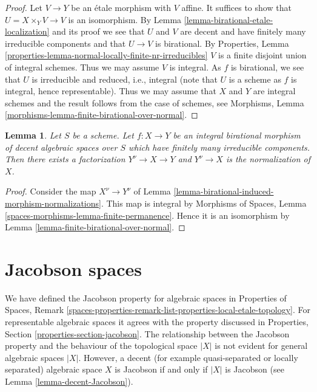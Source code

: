 \documentclass{stacks-project}
\theoremstyle{plain}
\newtheorem{lemma}[subsection]{Lemma}
\theoremstyle{definition}
\theoremstyle{remark}
\numberwithin{equation}{subsection}
\begin{document}
\begin{proof}
Let $V \to Y$ be an \'etale morphism with $V$ affine. It suffices to show that
$U = X \times_Y V \to V$ is an isomorphism. By
Lemma \ref{lemma-birational-etale-localization} and its proof
we see that $U$ and $V$ are decent and have finitely many
irreducible components and that $U \to V$ is birational.
By Properties, Lemma
\ref{properties-lemma-normal-locally-finite-nr-irreducibles}
$V$ is a finite disjoint union of integral schemes.
Thus we may assume $V$ is integral. As $f$ is birational, we
see that $U$ is irreducible and reduced, i.e., integral
(note that $U$ is a scheme as $f$ is integral, hence representable).
Thus we may assume that $X$ and $Y$ are integral schemes
and the result follows from the case of schemes, see
Morphisms, Lemma \ref{morphisms-lemma-finite-birational-over-normal}.
\end{proof}

\begin{lemma}
\label{lemma-normalization-normal}
Let $S$ be a scheme. Let $f : X \to Y$ be an integral birational morphism of
decent algebraic spaces over $S$ which have finitely many irreducible
components. Then there exists a factorization $Y^\nu \to X \to Y$ and
$Y^\nu \to X$ is the normalization of $X$.
\end{lemma}

\begin{proof}
Consider the map $X^\nu \to Y^\nu$ of
Lemma \ref{lemma-birational-induced-morphism-normalizations}.
This map is integral by
Morphisms of Spaces, Lemma \ref{spaces-morphisms-lemma-finite-permanence}.
Hence it is an isomorphism by
Lemma \ref{lemma-finite-birational-over-normal}.
\end{proof}




\section{Jacobson spaces}
\label{section-jacobson}

\noindent
We have defined the Jacobson property for algebraic spaces in
Properties of Spaces, Remark
\ref{spaces-properties-remark-list-properties-local-etale-topology}.
For representable algebraic spaces it agrees with the property discussed in
Properties, Section \ref{properties-section-jacobson}.
The relationship between the Jacobson property and the behaviour of
the topological space $|X|$ is not evident for general algebraic spaces $|X|$.
However, a decent (for example quasi-separated or locally separated)
algebraic space $X$ is Jacobson if and only if $|X|$ is Jacobson
(see Lemma \ref{lemma-decent-Jacobson}).
\end{document}
